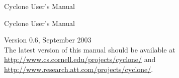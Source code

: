 \newif\ifpdf
\ifx\pdfoutput\undefined
  \pdffalse               %
\else
  \pdftrue
\fi

\usepackage{alltt}

\usepackage{makeidx}
\makeindex
\usepackage{color}
\usepackage{palatino}
\usepackage[colorlinks=true,linkcolor=bluegray,anchorcolor=bluegray,
citecolor=bluegray,filecolor=bluegray,menucolor=bluegray,pagecolor=bluegray,
urlcolor=bluegray]{hyperref}

\ifscreen
\setlength\paperheight{6in}
\setlength\paperwidth{8in}
\setlength\oddsidemargin{-.5in}
\setlength\textwidth{7in}
\setlength\topmargin{-1in}
\setlength\textheight{5in}
\ifpdf
\pdfpageheight=6in
\pdfpagewidth=8in
\fi %
\fi %

\usepackage{underscore}

\newcommand{\bs}{\texttt{\char`\\}}
\newcommand{\lb}{\texttt{\char`\{}}
\newcommand{\rb}{\texttt{\char`\}}}





\ifscreen
\thispagestyle{empty}
\textcolor{bluegray}{
\vspace{.5in}
\begin{center}
  {\fontsize{.9in}{.8in}\selectfont Cyclone User's Manual}\\[.5in]
\end{center}
}
\else
\vspace{1in}
\begin{center}
  \Huge Cyclone User's Manual
\end{center}
\fi
\begin{center}
{\Large Version 0.6, September 2003}\\[3ex]
The latest version of this manual should be available at\\
\href{http://www.cs.cornell.edu/projects/cyclone/}{http://www.cs.cornell.edu/projects/cyclone/} and\\
\href{http://www.research.att.com/projects/cyclone/}{http://www.research.att.com/projects/cyclone/}.
\end{center}


